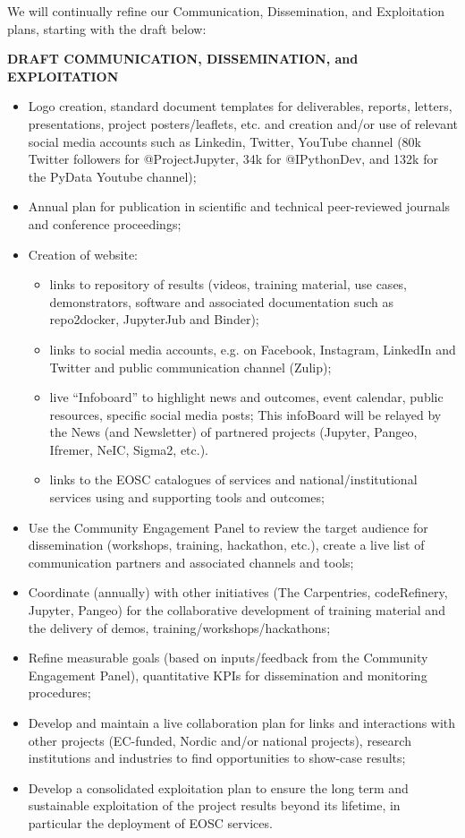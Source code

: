 We will continually refine our Communication, Dissemination, and Exploitation plans, starting with the draft below:
\label{box:draft-C-D-E-plan}
\begin{framed}

  \centerline{\textbf{ \TheProject DRAFT COMMUNICATION, DISSEMINATION, and EXPLOITATION}}
  {
  \begin{itemize}

\item Logo creation, standard document templates for deliverables, reports, letters, presentations, project posters/leaflets, etc. and creation and/or use of relevant social media accounts such as Linkedin, Twitter, YouTube channel (80k Twitter followers for @ProjectJupyter, 34k for @IPythonDev, and 132k for the PyData Youtube channel);
\item Annual plan for publication in scientific and technical peer-reviewed journals and conference proceedings;
\item Creation of \TheProject website:
\begin{itemize}
\item links to \TheProject repository of results (videos, training material, use cases, demonstrators, software and associated documentation such as repo2docker, JupyterJub and Binder);
\item links to social media accounts, e.g. on Facebook, Instagram, LinkedIn and Twitter and public communication channel (Zulip);
\item live “Infoboard” to highlight news and outcomes, event calendar, public resources, specific social media posts; This infoBoard will be relayed by the News (and Newsletter) of partnered projects (Jupyter, Pangeo, Ifremer, NeIC, Sigma2, etc.).
\item links to the EOSC catalogues of services and national/institutional
  services using and supporting \TheProject{} tools and outcomes;
\end{itemize}
\item Use the Community Engagement Panel to review the target audience for dissemination (workshops, training, hackathon, etc.), create a live list of communication partners and associated channels and tools;
\item Coordinate (annually) with other initiatives (The Carpentries, codeRefinery, Jupyter, Pangeo) for the collaborative development of training material and the delivery of demos, training/workshops/hackathons;
\item Refine measurable goals (based on inputs/feedback from the Community
  Engagement Panel), quantitative KPIs for dissemination and monitoring procedures;
\item Develop and maintain a live collaboration plan for links and interactions with other projects (EC-funded, Nordic and/or national projects), research institutions and industries to find opportunities to show-case \TheProject results;
\item Develop a consolidated exploitation plan to ensure the long term and sustainable exploitation of the project results beyond its lifetime, in particular the deployment of EOSC services.
    \end{itemize}
}
\end{framed}

